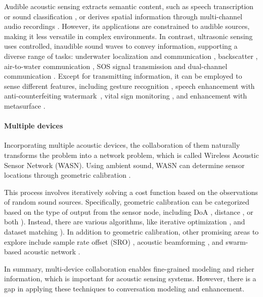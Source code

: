 Audible acoustic sensing extracts semantic content, such as speech transcription \cite{gao2023funasr} or sound classification \cite{gemmeke2017audio}, or derives spatial information through multi-channel audio recordings \cite{wang2019doa}. However, its applications are constrained to audible sources, making it less versatile in complex environments. In contrast, ultrasonic sensing uses controlled, inaudible sound waves to convey information, supporting a diverse range of tasks: underwater localization and communication \cite{chen2022underwater, chen2023underwater}, backscatter \cite{jang2019underwater}, air-to-water communication \cite{tonolini2018networking}, SOS signal transmission \cite{yang2023aquahelper} and dual-channel communication \cite{qian2021aircode}. Except for transmitting information, it can be employed to sense different features, including gesture recognition \cite{wang2020push}, speech enhancement with anti-counterfeiting watermark~\cite{sun2021ultrase, duan2024earse, duan2024f2key}, vital sign monitoring \cite{wang2022loear}, and enhancement with metasurface \cite{zhang2023acoustic}.

\paragraph{Multiple devices}
Incorporating multiple acoustic devices, the collaboration of them naturally transforms the problem into a network problem, which is called Wireless Acoustic Sensor Network (WASN). Using ambient sound, WASN can determine sensor locations through geometric calibration \cite{gburrek2021geometry}.

This process involves iteratively solving a cost function based on the observations of random sound sources. Specifically, geometric calibration can be categorized based on the type of output from the sensor node, including DoA \cite{wang2019doa}, distance \cite{gburrek2021iterative}, or both \cite{gburrek2021geometry}). Instead, there are various algorithms, like iterative optimization \cite{wang2019doa, fischler1981random}, and dataset matching \cite{gburrek2021geometry, hennecke2009hierarchical}).
In addition to geometric calibration, other promising areas to explore include sample rate offset (SRO) \cite{gburrek2022synchronization}, acoustic beamforming \cite{gburrek2023integration}, and swarm-based acoustic network \cite{itani2023creating}.

In summary, multi-device collaboration enables fine-grained modeling and richer information, which is important for acoustic sensing systems. However, there is a gap in applying these techniques to conversation modeling and enhancement.

